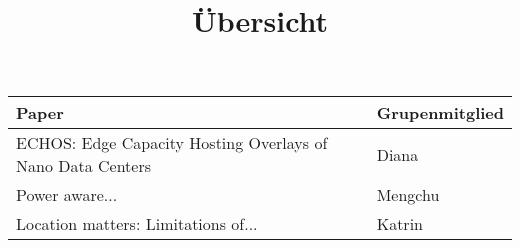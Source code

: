 \documentclass[11pt, twoside, BCOR=8mm, DIV=12]{scrartcl}
\title{Übersicht}
\begin{document}
\maketitle

\begin{tabular}{l | l}
Paper & Grupenmitglied \\
\hline
ECHOS: Edge Capacity Hosting Overlays of Nano Data Centers & Diana \\
Power aware... & Mengchu \\
Location matters: Limitations of... & Katrin \\
\end{tabular}
\end{document}
